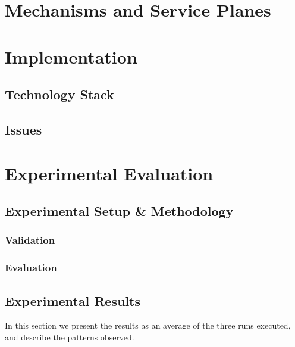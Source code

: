 \documentclass[10pt,journal,compsoc]{IEEEtran}
\begin{document}

	\section{Mechanisms and Service Planes}


	\section{Implementation}
	\subsection{Technology Stack}
	\subsection{Issues}

	
	\section{Experimental Evaluation}
	\subsection{Experimental Setup \& Methodology}
	\subsubsection{Validation}
	\subsubsection{Evaluation}
	\subsection{Experimental Results}
	
	In this section we present the results as an average of the three runs executed, and describe the patterns observed.
	
	
\end{document}
